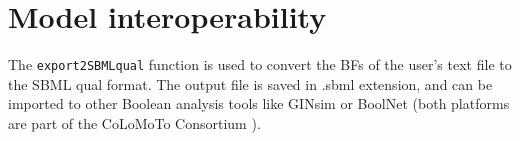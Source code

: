 \documentclass[a4paper]{article}
\begin{document}
\section{Model interoperability}
The \texttt{export2SBMLqual} function is used to convert the BFs of the user's text file to the SBML qual format\cite{Chaouiya2013-ov}. The output file is saved in .sbml extension, and can be imported to other Boolean analysis tools like GINsim\cite{Gonzalez2006-up} or BoolNet\cite{Mussel2010-zu} (both platforms are part of the CoLoMoTo Consortium \cite{Naldi2015-jp}).

\begin{Schunk}
\end{Schunk}

\clearpage



\end{document}
